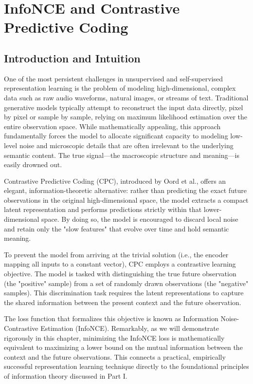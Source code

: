\chapter{InfoNCE and Contrastive Predictive Coding}
\label{chap:infonce}

\section{Introduction and Intuition}

One of the most persistent challenges in unsupervised and self-supervised representation learning is the problem of modeling high-dimensional, complex data such as raw audio waveforms, natural images, or streams of text. Traditional generative models typically attempt to reconstruct the input data directly, pixel by pixel or sample by sample, relying on maximum likelihood estimation over the entire observation space. While mathematically appealing, this approach fundamentally forces the model to allocate significant capacity to modeling low-level noise and microscopic details that are often irrelevant to the underlying semantic content. The true signal---the macroscopic structure and meaning---is easily drowned out.

Contrastive Predictive Coding (CPC), introduced by Oord et al., offers an elegant, information-theoretic alternative: rather than predicting the exact future observations in the original high-dimensional space, the model extracts a compact latent representation and performs predictions strictly within that lower-dimensional space. By doing so, the model is encouraged to discard local noise and retain only the "slow features" that evolve over time and hold semantic meaning.

To prevent the model from arriving at the trivial solution (i.e., the encoder mapping all inputs to a constant vector), CPC employs a contrastive learning objective. The model is tasked with distinguishing the true future observation (the "positive" sample) from a set of randomly drawn observations (the "negative" samples). This discrimination task requires the latent representations to capture the shared information between the present context and the future observation. 

The loss function that formalizes this objective is known as Information Noise-Contrastive Estimation (InfoNCE). Remarkably, as we will demonstrate rigorously in this chapter, minimizing the InfoNCE loss is mathematically equivalent to maximizing a lower bound on the mutual information between the context and the future observations. This connects a practical, empirically successful representation learning technique directly to the foundational principles of information theory discussed in Part I.

